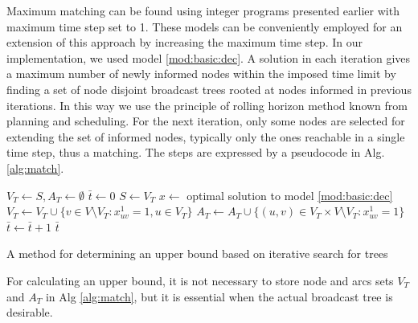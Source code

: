 Maximum matching can be found using integer programs presented earlier with maximum time step set to 1.
These models can be conveniently employed for an extension of this approach by increasing the maximum time step.
In our implementation, we used model \eqref{mod:basic:dec}.
A solution in each iteration gives a maximum number of newly informed nodes within the imposed time limit by finding a set of node disjoint broadcast trees rooted at nodes informed in previous iterations.
In this way we use the principle of rolling horizon method known from planning and scheduling.
For the next iteration, only some nodes are selected for extending the set of informed nodes, typically only the ones reachable in a single time step, thus a matching.
The steps are expressed by a pseudocode in Alg. \ref{alg:match}.
\begin{algorithm}[]
$V_T\leftarrow S, A_T \leftarrow \emptyset$\;
$\bar{t}\leftarrow 0$\;
 {
	$S\leftarrow V_T$\;
	$x\leftarrow$ optimal solution to model \eqref{mod:basic:dec}\;
	$V_T\leftarrow V_T\cup \{v\in V\setminus V_T:x_{uv}^1=1, u\in V_T\}$\;
	$A_T\leftarrow A_T\cup \{(u,v)\in V_T\times V\setminus V_T: x_{uv}^1=1\}$\;
	$\bar{t}\leftarrow \bar{t}+1$\;
}
\Return $\bar{t}$\;
 \caption{A method for determining an upper bound based on iterative search for  trees}
\label{alg:match}
\end{algorithm}

For calculating an upper bound, it is not necessary to store node and arcs sets $V_T$ and $A_T$ in Alg \ref{alg:match},
but it is essential when the actual broadcast tree is desirable.
